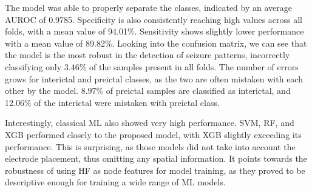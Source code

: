 \documentclass[a4paper,fleqn]{cas-sc}
\begin{document}
The model was able to properly separate the classes, indicated by an average AUROC of 0.9785. Specificity is also consistently reaching high values across all folds, with a mean value of 94.01\%. Sensitivity shows slightly lower performance with a mean value of 89.82\%. Looking into the confusion matrix, we can see that the model is the most robust in the detection of seizure patterns, incorrectly classifying only 3.46\% of the samples present in all folds. The number of errors grows for interictal and preictal classes, as the two are often mistaken with each other by the model. 8.97\% of preictal samples are classified as interictal, and 12.06\% of the interictal were mistaken with preictal class.

Interestingly, classical ML also showed very high performance. SVM, RF, and XGB performed closely to the proposed model, with XGB slightly exceeding its performance. This is surprising, as those models did not take into account the electrode placement, thus omitting any spatial information. It points towards the robustness of using HF as node features for model training, as they proved to be descriptive enough for training a wide range of ML models.


\begin{table}[h]
\centering
{}
\caption{Performance of the proposed model (*) compared with other machine learning algorithms. LR, SVM, RF, and XGB stand for Logistic Regression, Support Vector Machine, Random Forest, and XGBoost, respectively.}
\label{tab:final-run}
\end{table}
\end{document}
